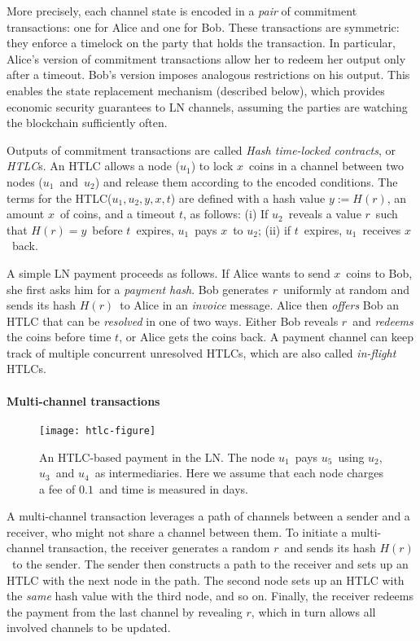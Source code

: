 More precisely, each channel state is encoded in a \textit{pair} of commitment transactions: one for Alice and one for Bob.
These transactions are symmetric: they enforce a timelock on the party that holds the transaction.
In particular, Alice's version of commitment transactions allow her to redeem her output only after a timeout.
Bob's version imposes analogous restrictions on his output.
This enables the state replacement mechanism (described below), which provides economic security guarantees to LN channels, assuming the parties are watching the blockchain sufficiently often.

Outputs of commitment transactions are called \textit{Hash time-locked contracts}, or \textit{HTLC}s.
An HTLC allows a node ($u_1$) to lock $x$~coins in a channel between two nodes ($u_1$~and~$u_2$) and release them according to the encoded conditions.
The terms for the HTLC($u_1, u_2, y, x, t$) are defined with a hash value $y := H(r)$, an amount $x$~of coins, and a timeout $t$, as follows: 
(i) If $u_2$~reveals a value $r$~such that $H(r) = y$~before $t$~expires, $u_1$~pays $x$~to $u_2$; 
(ii) if $t$~expires, $u_1$~receives $x$~back.

A simple LN payment proceeds as follows.
If Alice wants to send $x$~coins to Bob, she first asks him for a \textit{payment hash}.
Bob generates $r$~uniformly at random and sends its hash $H(r)$~to Alice in an \textit{invoice} message.
Alice then \textit{offers} Bob an HTLC that can be \textit{resolved} in one of two ways.
Either Bob reveals $r$~and \textit{redeems} the coins before time $t$, or Alice gets the coins back.
A payment channel can keep track of multiple concurrent unresolved HTLCs, which are also called \textit{in-flight} HTLCs.


\paragraph{Multi-channel transactions}

\begin{figure*}[h]
	\texttt{[image: htlc-figure]}
	\caption{An HTLC-based payment in the LN\@. The node $u_1$~pays $u_5$~using $u_2$, $u_3$~and $u_4$~as intermediaries. 
		Here we assume that each node charges a fee of $0.1$~and time is measured in days.}
	\label{fig:htlc}
\end{figure*}

A multi-channel transaction leverages a path of channels between a sender and a receiver, who might not share a channel between them.
To initiate a multi-channel transaction, the receiver generates a random $r$~and sends its hash $H(r)$~to the sender.
The sender then constructs a path to the receiver and sets up an HTLC with the next node in the path.
The second node sets up an HTLC with the \textit{same} hash value with the third node, and so on.
Finally, the receiver redeems the payment from the last channel by revealing $r$, which in turn allows all involved channels to be updated.

